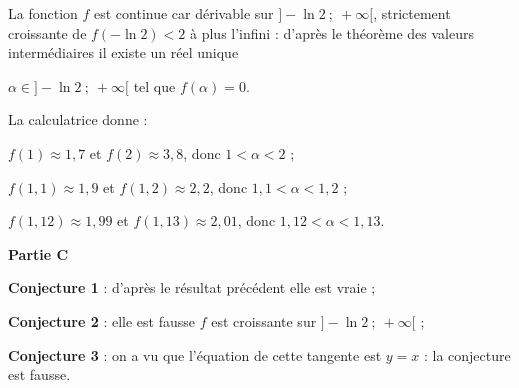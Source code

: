 \begin{enumerate}
La fonction $f$ est continue car dérivable sur $]- \ln 2~;~+ \infty[$, strictement croissante de $f(- \ln 2) < 2$ à plus l'infini : d'après le théorème des valeurs intermédiaires il existe un réel unique 

$\alpha \in ]- \ln 2~;~+ \infty[$ tel que $f(\alpha) = 0$.

La calculatrice donne :

$f(1) \approx 1,7$ et $f(2) \approx 3,8$, donc $1 < \alpha < 2$ ;

$f(1,1) \approx 1,9$ et $f(1,2) \approx 2,2$, donc $1,1 < \alpha < 1,2$ ;

$f(1,12) \approx 1,99$ et $f(1,13) \approx 2,01$, donc $1,12 < \alpha < 1,13$.
\end{enumerate}

\medskip

\textbf{Partie C}

\medskip


\textbf{Conjecture 1} : d'après le résultat précédent elle est vraie ;

\textbf{Conjecture 2} : elle est fausse $f$ est croissante sur $]- \ln 2~;~+ \infty[$ ;

\textbf{Conjecture 3} : on a vu que l'équation de cette tangente est $y = x$ : la conjecture est fausse.

\medskip
